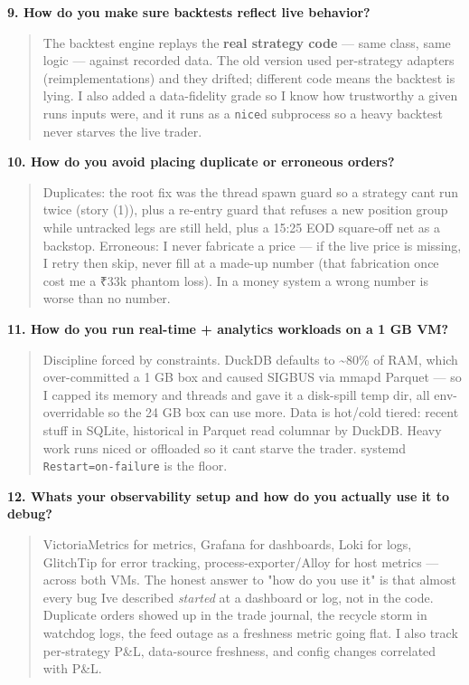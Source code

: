 \documentclass[11pt]{article}
\begin{document}
\textbf{9. How do you make sure backtests reflect live behavior?}

\begin{quote}
The backtest engine replays the \textbf{real strategy code} --- same class, same logic --- against
recorded data. The old version used per-strategy adapters (reimplementations) and they drifted;
different code means the backtest is lying. I also added a data-fidelity grade so I know how
trustworthy a given run\textquotesingle s inputs were, and it runs as a \texttt{nice}d subprocess so a heavy backtest
never starves the live trader.
\end{quote}

\textbf{10. How do you avoid placing duplicate or erroneous orders?}

\begin{quote}
Duplicates: the root fix was the thread spawn guard so a strategy can\textquotesingle t run twice (story (1)),
plus a re-entry guard that refuses a new position group while untracked legs are still held, plus
a 15:25 EOD square-off net as a backstop. Erroneous: I never fabricate a price --- if the live
price is missing, I retry then skip, never fill at a made-up number (that fabrication once cost
me a ₹33k phantom loss). In a money system a wrong number is worse than no number.
\end{quote}

\textbf{11. How do you run real-time + analytics workloads on a 1 GB VM?}

\begin{quote}
Discipline forced by constraints. DuckDB defaults to \textasciitilde80\% of RAM, which over-committed a 1 GB
box and caused SIGBUS via mmap\textquotesingle d Parquet --- so I capped its memory and threads and gave it a
disk-spill temp dir, all env-overridable so the 24 GB box can use more. Data is hot/cold tiered:
recent stuff in SQLite, historical in Parquet read columnar by DuckDB. Heavy work runs niced or
offloaded so it can\textquotesingle t starve the trader. systemd \texttt{Restart=on-failure} is the floor.
\end{quote}

\textbf{12. What\textquotesingle s your observability setup and how do you actually use it to debug?}

\begin{quote}
VictoriaMetrics for metrics, Grafana for dashboards, Loki for logs, GlitchTip for error
tracking, process-exporter/Alloy for host metrics --- across both VMs. The honest answer to "how
do you use it" is that almost every bug I\textquotesingle ve described \emph{started} at a dashboard or log, not in
the code. Duplicate orders showed up in the trade journal, the recycle storm in watchdog logs,
the feed outage as a freshness metric going flat. I also track per-strategy P\&L, data-source
freshness, and config changes correlated with P\&L.
\end{quote}
\end{document}
